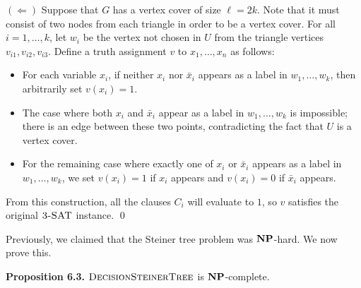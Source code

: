 \documentclass{article}
\DeclareMathOperator{\NP}{{\bf NP}}
\DeclareMathOperator{\DecisionSteinerTree}{\textsc{DecisionSteinerTree}}
\DeclareMathOperator{\SAT}{\textsc{3-SAT}}
\begin{document}
{$(\Leftarrow)$ Suppose that $G$ has a vertex cover of size $\ell = 2k$. 
Note that it must consist of two nodes from each triangle in order to 
be a vertex cover. For all $i = 1, \dots, k$, let $w_i$ be the vertex 
not chosen in $U$ from the triangle vertices $v_{i1}, v_{i2}, v_{i3}$. 
Define a truth assignment $v$ to $x_1, \dots, x_n$ as follows: 
\begin{itemize}
    \item For each variable $x_i$, if neither $x_i$ nor $\bar x_i$ appears 
    as a label in $w_1, \dots, w_k$, then arbitrarily set $v(x_i) = 1$. 
    \item The case where both $x_i$ and $\bar x_i$ appear as a label 
    in $w_1, \dots, w_k$ is impossible; there is an edge between these two 
    points, contradicting the fact that $U$ is a vertex cover.
    \item For the remaining case where exactly one of $x_i$ or $\bar x_i$ 
    appears as a label in $w_1, \dots, w_k$, we set $v(x_i) = 1$ if 
    $x_i$ appears and $v(x_i) = 0$ if $\bar x_i$ appears.
\end{itemize}
From this construction, all the clauses $C_i$ will evaluate to $1$, so 
$v$ satisfies the original $\SAT$ instance. \qed 
}

Previously, we claimed that the Steiner tree problem was $\NP$-hard. 
We now prove this. 

{\color{violet}
{\bf Proposition 6.3.} $\DecisionSteinerTree$ is $\NP$-complete. 
}
\end{document}
